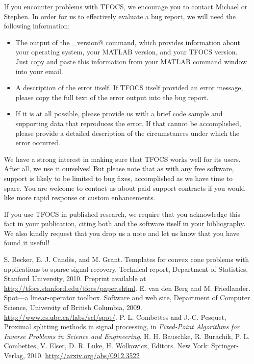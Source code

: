 \documentclass{article}
\begin{document}
If you encounter problems
with TFOCS, we encourage you to contact Michael or Stephen. In order
for us to effectively evaluate a bug report, we will need 
the following information:
\begin{itemize}
\item The output of the \verb@tfocs_version@ command, which provides
information about your operating system, your MATLAB version, and your
TFOCS version. Just copy and paste this information from your MATLAB
command window into your email.
\item A description of the error itself. If TFOCS itself provided an
error message, please copy the full text of the error output 
into the bug report.
\item If it is at all possible, please provide us with a brief code
sample and supporting data that reproduces the error. If that cannot
be accomplished, please provide a detailed description of the
circumstances under which the error occurred.
\end{itemize}
We have a strong interest in making sure that TFOCS works
well for its users. After all, we use it ourselves!
But please note that as with any free software, 
support is likely to be limited to bug fixes, accomplished
as we have time to spare.
You are welcome to contact us about paid support contracts if you
would like more rapid response or custom enhancements.

If you use TFOCS in published research, we require that you acknowledge
this fact in your publication, citing both \cite{TFOCS} and the
software itself in your
bibliography. We also kindly request that you drop us a note and let
us know that you have found it useful!

\begin{thebibliography}{2}
 S. Becker, E. J. Cand\`es, and M. Grant.
Templates for convex cone problems with applications to sparse
signal recovery. Technical report, Department of Statistics,
Stanford University, 2010.
Preprint available at \url{http://tfocs.stanford.edu/tfocs/paper.shtml}.
 E. van den Berg and M. Friedlander. Spot---a linear-operator
toolbox. Software and web site, Department of Computer Science, 
University of British Columbia, 2009. \url{http://www.cs.ubc.ca/labs/scl/spot/}.
P. L. Combettes and J.-C. Pesquet, Proximal splitting methods in signal processing, in \emph{Fixed-Point Algorithms for Inverse Problems in Science and Engineering}, H. H. Bauschke, R. Burachik, P. L. Combettes, V. Elser, D. R. Luke, H. Wolkowicz, Editors. New York: Springer-Verlag, 2010.
\url{http://arxiv.org/abs/0912.3522}
\end{thebibliography}
\end{document}
